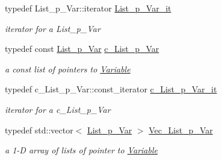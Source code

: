 \begin{DoxyCompactItemize}
typedef List\+\_\+p\+\_\+\+Var\+::iterator \mbox{\hyperlink{group___variable___t_y_p_e_s_ga01b5f0523f638dd5836a17a6d5eb3d66}{List\+\_\+p\+\_\+\+Var\+\_\+it}}
\begin{DoxyCompactList}\small\item\em iterator for a List\+\_\+p\+\_\+\+Var \end{DoxyCompactList}\item 
\mbox{\label{group___variable___t_y_p_e_s_ga31b17209d66be7b60e6114541813bc43}} 
typedef const \mbox{\hyperlink{group___variable___t_y_p_e_s_ga1fccfcb7d57847e2b9ba2fa0c6100b80}{List\+\_\+p\+\_\+\+Var}} \mbox{\hyperlink{group___variable___t_y_p_e_s_ga31b17209d66be7b60e6114541813bc43}{c\+\_\+\+List\+\_\+p\+\_\+\+Var}}
\begin{DoxyCompactList}\small\item\em a const list of pointers to \mbox{\hyperlink{class_s_m_spp__di__unipi__it_1_1_variable}{Variable}} \end{DoxyCompactList}\item 
\mbox{\label{group___variable___t_y_p_e_s_gad262f9de9e10586f390bc7a2fc05edbc}} 
typedef c\+\_\+\+List\+\_\+p\+\_\+\+Var\+::const\+\_\+iterator \mbox{\hyperlink{group___variable___t_y_p_e_s_gad262f9de9e10586f390bc7a2fc05edbc}{c\+\_\+\+List\+\_\+p\+\_\+\+Var\+\_\+it}}
\begin{DoxyCompactList}\small\item\em iterator for a c\+\_\+\+List\+\_\+p\+\_\+\+Var \end{DoxyCompactList}\item 
\mbox{\label{group___variable___t_y_p_e_s_ga5c28c8956e72a58b668b86adad8c7805}} 
typedef std\+::vector$<$ \mbox{\hyperlink{group___variable___t_y_p_e_s_ga1fccfcb7d57847e2b9ba2fa0c6100b80}{List\+\_\+p\+\_\+\+Var}} $>$ \mbox{\hyperlink{group___variable___t_y_p_e_s_ga5c28c8956e72a58b668b86adad8c7805}{Vec\+\_\+\+List\+\_\+p\+\_\+\+Var}}
\begin{DoxyCompactList}\small\item\em a 1-\/D array of lists of pointer to \mbox{\hyperlink{class_s_m_spp__di__unipi__it_1_1_variable}{Variable}} \end{DoxyCompactList}\item 
\mbox{\label{group___variable___t_y_p_e_s_ga5419498ee46468a022e7234342622423}} 

\end{DoxyCompactItemize}
